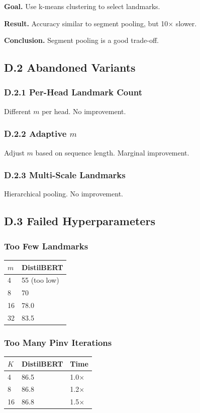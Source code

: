 \textbf{Goal.} Use k-means clustering to select landmarks.

\textbf{Result.} Accuracy similar to segment pooling, but 10$\times$ slower.

\textbf{Conclusion.} Segment pooling is a good trade-off.

\subsection{D.2 Abandoned Variants}

\subsubsection{D.2.1 Per-Head Landmark Count}

Different $m$ per head. No improvement.

\subsubsection{D.2.2 Adaptive $m$}

Adjust $m$ based on sequence length. Marginal improvement.

\subsubsection{D.2.3 Multi-Scale Landmarks}

Hierarchical pooling. No improvement.

\subsection{D.3 Failed Hyperparameters}

\subsubsection{Too Few Landmarks}
\begin{table}[H]
\centering
\small
\begin{tabular}{ll}
\toprule
\textbf{$m$} & \textbf{DistilBERT} \\
\midrule
4 & 55 (too low) \\
8 & 70 \\
16 & 78.0 \\
32 & 83.5 \\
\bottomrule
\end{tabular}
\end{table}

\subsubsection{Too Many Pinv Iterations}
\begin{table}[H]
\centering
\small
\begin{tabular}{lll}
\toprule
\textbf{$K$} & \textbf{DistilBERT} & \textbf{Time} \\
\midrule
4 & 86.5 & 1.0$\times$ \\
8 & 86.8 & 1.2$\times$ \\
16 & 86.8 & 1.5$\times$ \\
\bottomrule
\end{tabular}
\end{table}

